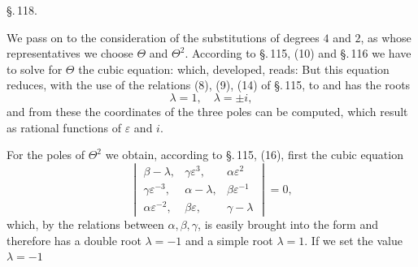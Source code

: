 
\begin{center}
\S.\,118.

\end{center}

We pass on to the consideration of the substitutions of degrees $4$ and $2$, as whose representatives we choose $\Theta$ and $\Theta^2$. According to \S.\,115, (10) and \S.\,116 we have to solve for $\Theta$ the cubic equation:
which, developed, reads:
But this equation reduces, with the use of the relations (8), (9), (14) of \S.\,115, to
and has the roots
\[
\lambda=1,\quad \lambda=\pm i,
\]
and from these the coordinates of the three poles can be computed, which result as rational functions of $\varepsilon$ and $i$.

For the poles of $\Theta^2$ we obtain, according to \S.\,115, (16), first the cubic equation
\[
\begin{vmatrix}
\beta-\lambda, & \gamma\varepsilon^3, & \alpha\varepsilon^2\\
\gamma\varepsilon^{-3}, & \alpha-\lambda, & \beta\varepsilon^{-1}\\
\alpha\varepsilon^{-2}, & \beta\varepsilon, & \gamma-\lambda
\end{vmatrix} = 0,
\]
which, by the relations between $\alpha,\beta,\gamma$, is easily brought into the form
and therefore has a double root $\lambda=-1$ and a simple root $\lambda=1$. If we set the value $\lambda=-1$
